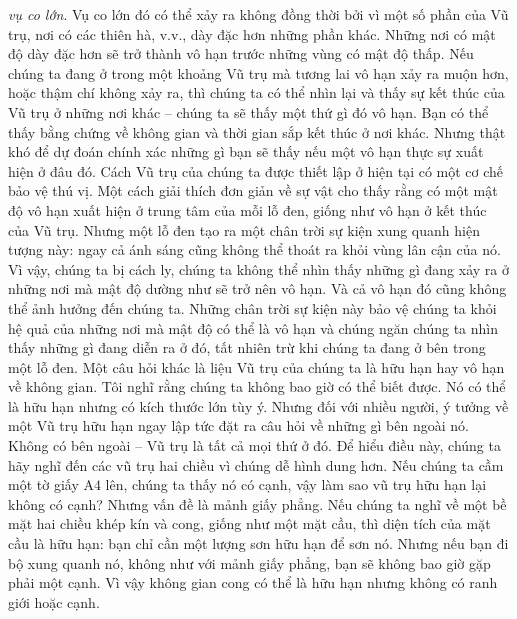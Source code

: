 \begin{multicols}{2}
	\textit{vụ co lớn}. Vụ co lớn đó có thể xảy ra không đồng thời bởi vì một số
	phần của Vũ trụ, nơi có các thiên hà, v.v., dày đặc hơn những phần khác. Những
	nơi có mật độ dày đặc hơn sẽ trở thành vô hạn trước những vùng
	có mật độ thấp. Nếu chúng ta đang ở trong một khoảng Vũ trụ mà tương
	lai vô hạn xảy ra muộn hơn, hoặc thậm chí không xảy ra, thì chúng ta có thể
	nhìn lại và thấy sự kết thúc của Vũ trụ ở những nơi khác -- chúng ta sẽ thấy
	một thứ gì đó vô hạn. Bạn có thể thấy bằng chứng về không gian và thời gian
	sắp kết thúc ở nơi khác.
	\vskip 0.05cm
	Nhưng thật khó để dự đoán chính xác những gì bạn sẽ thấy nếu một vô hạn thực
	sự xuất hiện ở đâu đó. Cách Vũ trụ của chúng ta được thiết lập ở hiện tại
	có một cơ chế bảo vệ thú vị. Một cách giải thích đơn giản về sự vật cho
	thấy rằng có một mật độ vô hạn xuất hiện ở trung tâm của mỗi lỗ đen, giống như
	vô hạn ở kết thúc của Vũ trụ. Nhưng một lỗ đen tạo ra một chân trời sự kiện
	xung quanh hiện tượng này: ngay cả ánh sáng cũng không thể thoát ra khỏi vùng
	lân cận của nó. Vì vậy, chúng ta bị cách ly, chúng ta không thể nhìn thấy
	những gì đang xảy ra ở những nơi mà mật độ dường như sẽ trở nên vô hạn. Và cả
	vô hạn đó cũng không thể ảnh hưởng đến chúng ta. Những chân trời sự kiện này bảo vệ chúng ta khỏi hệ quả của những nơi mà mật độ có thể là vô hạn và chúng ngăn
	chúng ta nhìn thấy những gì đang diễn ra ở đó, tất nhiên trừ khi chúng ta đang
	ở bên trong một lỗ đen.
	\vskip 0.05cm
	Một câu hỏi khác là liệu Vũ trụ của chúng ta là hữu hạn hay vô hạn về không
	gian. Tôi nghĩ rằng chúng ta không bao giờ có thể biết được. Nó có thể là hữu
	hạn nhưng có kích thước lớn tùy ý. Nhưng đối với nhiều người, ý tưởng về một
	Vũ trụ hữu hạn ngay lập tức đặt ra câu hỏi về những gì bên ngoài nó. Không có
	bên ngoài -- Vũ trụ là tất cả mọi thứ ở đó. Để hiểu điều này, chúng ta hãy
	nghĩ đến các vũ trụ hai chiều vì chúng dễ hình dung hơn. Nếu chúng ta cầm một
	tờ giấy A$4$ lên, chúng ta thấy nó có cạnh, vậy làm sao vũ trụ hữu hạn lại
	không có cạnh? Nhưng vấn đề là mảnh giấy phẳng. Nếu chúng ta nghĩ về một bề
	mặt hai chiều khép kín và cong, giống như một mặt cầu, thì diện
	tích của mặt cầu là hữu hạn: bạn chỉ cần một lượng sơn hữu hạn để sơn nó.
	Nhưng nếu bạn đi bộ xung quanh nó, không như với mảnh giấy phẳng, bạn sẽ
	không bao giờ gặp phải một cạnh. Vì vậy không gian cong có thể là hữu hạn
	nhưng không có ranh giới hoặc cạnh.
	\begin{figure}[H]
		\centering
		\vspace*{-5pt}
		\captionsetup{labelformat= empty, justification=centering}

\end{figure}
\end{multicols}
